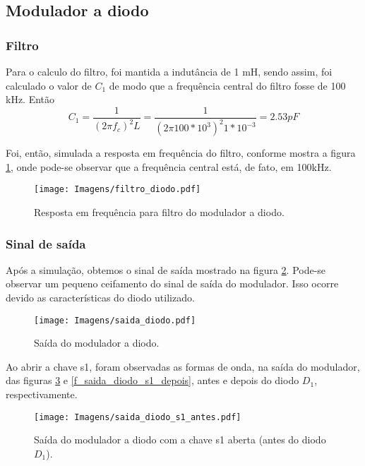 \subsection{Modulador a diodo}

\subsubsection{Filtro} 

Para o calculo do filtro, foi mantida a indutância de 1 mH, sendo assim, foi calculado o valor de $C_1$ de modo que a frequência central do filtro fosse de 100 kHz.
Então
\[
C_1 = \frac{1}{(2\pi f_c)^2 L } = \frac{1}{(2\pi 100*10^3 )^2 1*10^{-3}} = 2.53pF
\]

Foi, então, simulada a resposta em frequência do filtro, conforme mostra a figura \ref{f_filtro_diodo}, onde pode-se observar que a frequência central está, de fato, em 100kHz.

\begin{figure}[H]
    \centering
    \caption{Resposta em frequência para filtro do modulador a diodo.}
    \texttt{[image: Imagens/filtro\_diodo.pdf]}
    \label{f_filtro_diodo}
\end{figure}

\subsubsection{Sinal de saída}

Após a simulação, obtemos o sinal de saída mostrado na figura \ref{f_saida_diodo}. Pode-se observar um pequeno ceifamento do sinal de saída do modulador. Isso ocorre devido as características do diodo utilizado.

\begin{figure}[H]
    \centering
    \caption{Saída do modulador a diodo.}
    \texttt{[image: Imagens/saida\_diodo.pdf]}
    \label{f_saida_diodo}
\end{figure}

Ao abrir a chave s1, foram observadas as formas de onda, na saída do modulador, das figuras \ref{f_saida_diodo_s1_antes} e \ref{f_saida_diodo_s1_depois}, antes e depois do diodo $D_1$, respectivamente.

\begin{figure}[H]
    \centering
    \caption{Saída do modulador a diodo com a chave s1 aberta (antes do diodo $D_1$).}
    \texttt{[image: Imagens/saida\_diodo\_s1\_antes.pdf]}
    \label{f_saida_diodo_s1_antes}
\end{figure}

